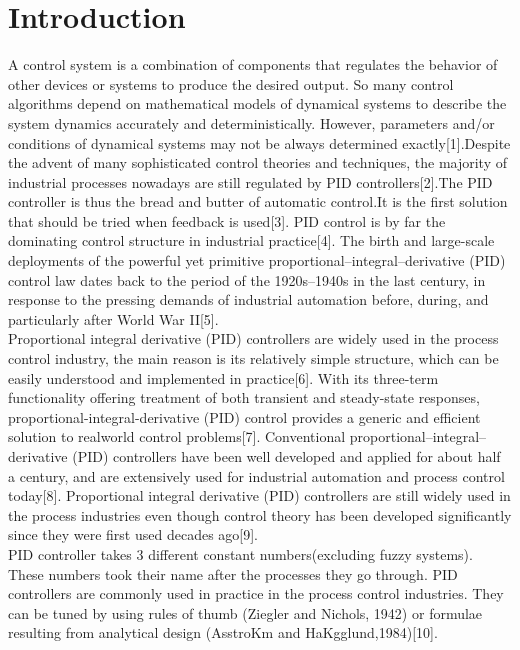 \documentclass[9pt]{article}
\begin{document}
\section{Introduction}
\begin{multicols}{2}
A control system is a combination of components 
that regulates the behavior of other devices or systems 
to produce the desired output. 
So many control algorithms depend on mathematical models of 
dynamical systems to describe the system dynamics accurately and deterministically. 
However, parameters and/or conditions of dynamical systems may not be always determined exactly[1].Despite the advent of many sophisticated
control theories and techniques, the majority of
industrial processes nowadays are still regulated
by PID controllers[2].The PID controller is thus the bread and butter of automatic
control.It is the first solution that should be tried when
feedback is used[3]. PID control is by far the dominating control
structure in industrial practice[4].
The birth and large-scale deployments of the powerful yet primitive proportional–integral–derivative (PID) control law dates back to the period of the 1920s–1940s in the last century, in response to the pressing demands of industrial
automation before, during, and particularly after World War II[5].\\[0.4mm]
Proportional integral derivative (PID) controllers are widely used in the process control industry, the main reason is its relatively simple structure, which can be easily understood and implemented in practice[6]. With its three-term functionality offering treatment of both transient and steady-state responses, proportional-integral-derivative (PID) control provides a generic and efficient solution to realworld control problems[7]. Conventional proportional–integral–derivative (PID)
controllers have been well developed and applied for
about half a century, and are extensively used for industrial
automation and process control today[8]. Proportional integral derivative (PID) controllers are still widely used in the process industries even though control
theory has been developed significantly since they were
first used decades ago[9].\\[0.4mm]
PID controller takes 3 different constant numbers(excluding fuzzy systems).
These numbers took their name after the processes they go through. PID controllers are commonly used in practice in the process control industries. They can be tuned by using rules of thumb (Ziegler and Nichols, 1942) or formulae
resulting from analytical design (AsstroKm and HaKgglund,1984)[10].\\[0.4mm]

\end{multicols}
\end{document}
